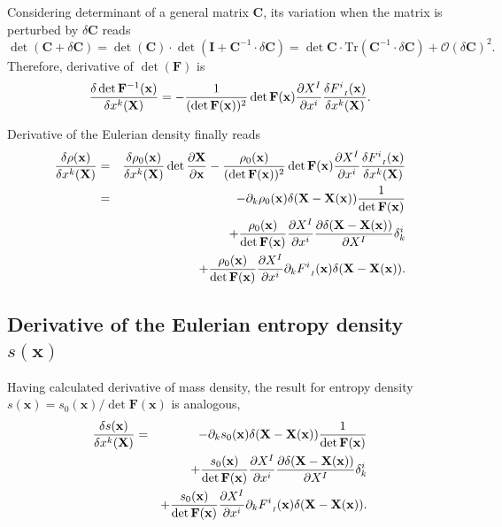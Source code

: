 \documentclass[
10pt, %
a4paper, %
oneside, %
headinclude,footinclude, %
BCOR5mm, %
]{scrartcl}
\newcommand{\xx}{\mathbf{x}}
\newcommand{\XX}{\mathbf{X}}
\newcommand{\Id}{\mathbf{I}}
\newcommand{\Tr}{\mathrm{Tr}}
\newcommand{\CC}{\mathbf{C}}
\newcommand{\OBig}{\mathcal{O}}
\newcommand{\FF}{\mathbf{F}}
\newcommand{\F}[2]{F^{#1}_{\ \, \mathsmaller#2}}
\begin{document}
Considering determinant of a general matrix $\CC$, its variation when the matrix is perturbed by $\delta\CC$ reads
\begin{equation}
	\det(\CC+\delta\CC) = \det(\CC)\cdot\det(\Id+\CC^{-1}\cdot\delta\CC) = \det\CC\cdot\Tr(\CC^{-1}\cdot\delta\CC) + \OBig(\delta \CC)^2.
\end{equation}
Therefore, derivative of $\det(\FF)$ is
\begin{equation}
	\frac{\delta \det \FF^{-1}(\xx)}{\delta x^k(\XX)}
	= -\frac{1}{(\det \FF(\xx))^2} \det \FF(\xx) \frac{\partial X^I}{\partial x^i} \frac{\delta 
	\F{i}{I}(\xx)}{\delta x^k(\XX)}.
\end{equation}

Derivative of the Eulerian density finally reads
\begin{eqnarray}
	\frac{\delta \rho(\xx)}{\delta x^k(\XX)}&=&\frac{\delta \rho_0(\xx)}{\delta x^k(\XX)} \det \frac{\partial \XX}{\partial \xx}
	-\frac{\rho_0(\xx)}{(\det \FF(\xx))^2} \det \FF(\xx) \frac{\partial X^I}{\partial x^i} 
	\frac{\delta \F{i}{I}(\xx)}{\delta x^k(\XX)}\nonumber\\
	&=&-\partial_k \rho_0(\xx) \delta(\XX-\XX(\xx))\frac{1}{\det\FF(\xx)}\nonumber\\
	&&
	+\frac{\rho_0(\xx)}{\det \FF(\xx)} \frac{\partial X^I}{\partial x^i} \frac{\partial \delta(\XX-\XX(\xx))}{\partial X^I}\delta^i_k \nonumber\\
	&&+\frac{\rho_0(\xx)}{\det \FF(\xx)} \frac{\partial X^I}{\partial x^i} \partial_k 
	\F{i}{I}(\xx)\delta(\XX-\XX(\xx)).
\end{eqnarray}

\subsection{Derivative of the Eulerian entropy density $s(\xx)$}
Having calculated derivative of mass density, the result for entropy density $s(\xx)=s_0(\xx)/\det\FF(\xx)$  is analogous,
\begin{eqnarray}
	\frac{\delta s(\xx)}{\delta x^k(\XX)}&=&
	-\partial_k s_0(\xx) \delta(\XX-\XX(\xx))\frac{1}{\det\FF(\xx)}\nonumber\\
	&&
	+\frac{s_0(\xx)}{\det \FF(\xx)} \frac{\partial X^I}{\partial x^i} \frac{\partial \delta(\XX-\XX(\xx))}{\partial X^I}\delta^i_k \nonumber\\
	&&+\frac{s_0(\xx)}{\det \FF(\xx)} \frac{\partial X^I}{\partial x^i} \partial_k 
	\F{i}{I}(\xx)\delta(\XX-\XX(\xx)).
\end{eqnarray}
\end{document}
